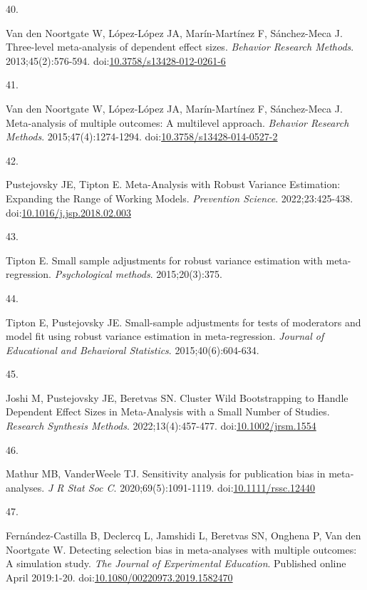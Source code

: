 \documentclass[
  man, donotrepeattitle,floatsintext]{apa7}
\newlength{\cslhangindent}
\newlength{\csllabelwidth}
\newenvironment{CSLReferences}[2] %
 {\begin{list}{}{%
  \setlength{\itemindent}{0pt}
  \setlength{\leftmargin}{0pt}
  \setlength{\parsep}{0pt}
  \ifodd #1
   \setlength{\leftmargin}{\cslhangindent}
   \setlength{\itemindent}{-1\cslhangindent}
  \fi
  \setlength{\itemsep}{#2\baselineskip}}}
 {\end{list}}
\newcommand{\CSLLeftMargin}[1]{\parbox[t]{\csllabelwidth}{\strut#1\strut}}
\newcommand{\CSLRightInline}[1]{\parbox[t]{\linewidth - \csllabelwidth}{\strut#1\strut}}
\begin{document}
\begin{CSLReferences}{0}{1}
\CSLLeftMargin{40. }%
\CSLRightInline{Van den Noortgate W, López-López JA, Marín-Martínez F, Sánchez-Meca J. Three-level meta-analysis of dependent effect sizes. \emph{Behavior Research Methods}. 2013;45(2):576-594. doi:\href{https://doi.org/10.3758/s13428-012-0261-6}{10.3758/s13428-012-0261-6}}

\CSLLeftMargin{41. }%
\CSLRightInline{Van den Noortgate W, López-López JA, Marín-Martínez F, Sánchez-Meca J. Meta-analysis of multiple outcomes: A multilevel approach. \emph{Behavior Research Methods}. 2015;47(4):1274-1294. doi:\href{https://doi.org/10.3758/s13428-014-0527-2}{10.3758/s13428-014-0527-2}}

\CSLLeftMargin{42. }%
\CSLRightInline{Pustejovsky JE, Tipton E. Meta-Analysis with Robust Variance Estimation: {Expanding} the Range of Working Models. \emph{Prevention Science}. 2022;23:425-438. doi:\href{https://doi.org/10.1016/j.jsp.2018.02.003}{10.1016/j.jsp.2018.02.003}}

\CSLLeftMargin{43. }%
\CSLRightInline{Tipton E. Small sample adjustments for robust variance estimation with meta-regression. \emph{Psychological methods}. 2015;20(3):375.}

\CSLLeftMargin{44. }%
\CSLRightInline{Tipton E, Pustejovsky JE. Small-sample adjustments for tests of moderators and model fit using robust variance estimation in meta-regression. \emph{Journal of Educational and Behavioral Statistics}. 2015;40(6):604-634.}

\CSLLeftMargin{45. }%
\CSLRightInline{Joshi M, Pustejovsky JE, Beretvas SN. Cluster Wild Bootstrapping to Handle Dependent Effect Sizes in Meta-Analysis with a Small Number of Studies. \emph{Research Synthesis Methods}. 2022;13(4):457-477. doi:\href{https://doi.org/10.1002/jrsm.1554}{10.1002/jrsm.1554}}

\CSLLeftMargin{46. }%
\CSLRightInline{Mathur MB, VanderWeele TJ. Sensitivity analysis for publication bias in meta‐analyses. \emph{J R Stat Soc C}. 2020;69(5):1091-1119. doi:\href{https://doi.org/10.1111/rssc.12440}{10.1111/rssc.12440}}

\CSLLeftMargin{47. }%
\CSLRightInline{Fernández-Castilla B, Declercq L, Jamshidi L, Beretvas SN, Onghena P, Van den Noortgate W. Detecting selection bias in meta-analyses with multiple outcomes: A simulation study. \emph{The Journal of Experimental Education}. Published online April 2019:1-20. doi:\href{https://doi.org/10.1080/00220973.2019.1582470}{10.1080/00220973.2019.1582470}}


\end{CSLReferences}
\end{document}
